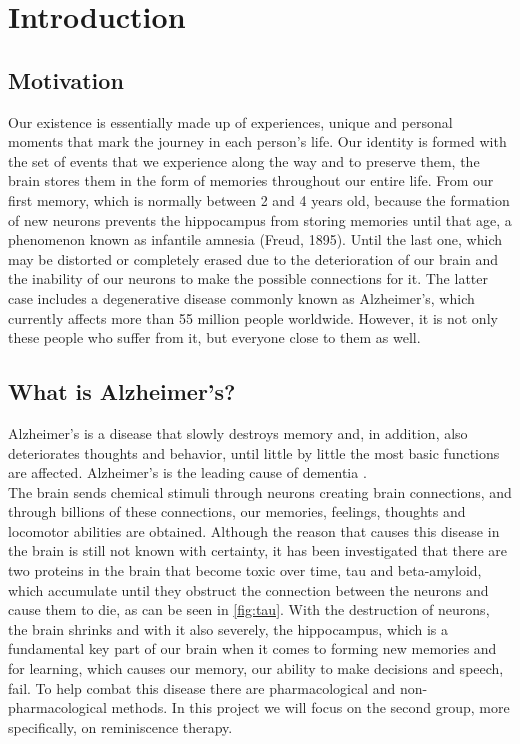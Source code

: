 \chapter*{Introduction}
\label{cap:introduction}


\section{Motivation}

Our existence is essentially made up of experiences, unique and personal moments that mark the journey in each person's life. Our identity is formed with the set of events that we experience along the way and to preserve them, the brain stores them in the form of memories throughout our entire life.   From our first memory, which is normally between 2 and 4 years old, because the formation of new neurons prevents the hippocampus from storing memories until that age, a phenomenon known as infantile amnesia (Freud, 1895). Until the last one, which may be distorted or completely erased due to the deterioration of our brain and the inability of our neurons to make the possible connections for it. The latter case includes a degenerative disease commonly known as Alzheimer's, which currently affects more than 55 million people worldwide. However, it is not only these people who suffer from it, but everyone close to them as well. \\

\section{What is Alzheimer's?}

Alzheimer's is a disease that slowly destroys memory and, in addition, also deteriorates thoughts and behavior, until little by little the most basic functions are affected. Alzheimer's is the leading cause of dementia \citep{NationalInstitute2023}.\\

The brain sends chemical stimuli through neurons creating brain connections, and through billions of these connections, our memories, feelings, thoughts and locomotor abilities are obtained. Although the reason that causes this disease in the brain is still not known with certainty, it has been investigated that there are two proteins in the brain that become toxic over time, tau and beta-amyloid, which accumulate until they obstruct the connection between the neurons and cause them to die, as can be seen in \ref{fig:tau}.   With the destruction of neurons, the brain shrinks and with it also severely, the hippocampus, which is a fundamental key part of our brain when it comes to forming new memories and for learning, which causes our memory, our ability to make decisions and speech, fail. To help combat this disease there are pharmacological and non-pharmacological methods. In this project we will focus on the second group, more specifically, on reminiscence therapy. \\

